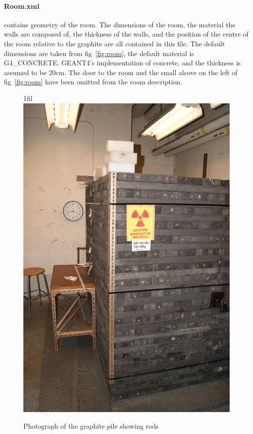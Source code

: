 \documentclass{article}
\makeatletter
\newcommand*{\centerfloat}{%
  \parindent \z@
  \leftskip \z@ \@plus 1fil \@minus \textwidth
  \rightskip\leftskip
  \parfillskip \z@skip}
\makeatother
\begin{document}
	\paragraph{Room.xml} contains geometry of the room. The dimensions of the room, the material the walls are composed of, the thickness of the walls, and the position of the centre of the room relative to the graphite are all contained in this file. The default dimensions are taken from fig~\ref{fig:room}, the default 
material is G4\_CONCRETE, GEANT4's implementation of concrete, and the thickness is assumed to be 20cm. The door to the room and the small alcove on the left of fig~\ref{fig:room} have been omitted from the room description.

\begin{figure}[htb]
	\centerfloat
	\includegraphics[width=\columnwidth]{images/Rods}
	\caption{Photograph of the graphite pile showing rods}	
	\label{fig:graphiteRods}
\end{figure}
\end{document}
